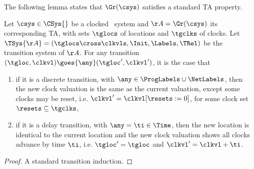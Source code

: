 The following lemma states that $\Gr(\csys)$ satisfies a standard TA
property.
\begin{lemma}\label{lem:pftadeterm}
Let $\csys \in \CSys{}$ be a clocked \bcandle\ system and
$\AA = \Gr(\csys)$ its corresponding TA, with sets $\tglocs$ of locations
and $\tgclks$ of clocks. Let
$\TSys{\AA} = (\tglocs \cross \clkvls,\Init,\Labels,\TRel)$ be the 
transition system of $\AA$. For any
transition $(\tgloc,\clkvl) \goes{\any} (\tgloc',\clkvl')$,
it is the case that
\begin{enumerate}
\item if it is a discrete transition, with
  $\any \in \ProgLabels \cup \NetLabels$, then the new clock valuation
  is the same as the current valuation, except some clocks may be reset, i.e.
  $\clkvl' = \clkvl[\resets:=0]$, for some clock set 
  $\resets \subseteq \tgclks$, 
\item if it is a delay transition, with $\any = \ti \in \Time$, then 
  the new location is identical to the current location and the new clock 
  valuation shows all clocks advance by time $\ti$, i.e.
  $\tgloc' = \tgloc$ and $\clkvl' = \clkvl + \ti$.
\end{enumerate}
\end{lemma}
\begin{proof}
A standard transition induction.
\end{proof}
  
